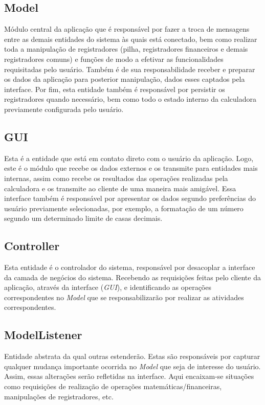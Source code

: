 \subsection{Model}
Módulo central da aplicação que é responsável por fazer a troca de mensagens entre as demais entidades do sistema às quais está conectado, bem como realizar toda a manipulação de registradores (pilha, registradores financeiros e demais registradores comuns) e funções de modo a efetivar as funcionalidades requisitadas pelo usuário. Também é de sua responsabilidade receber e preparar os dados da aplicação para posterior manipulação, dados esses captados pela interface. Por fim, esta entidade também é responsável por persistir os registradores quando necessário, bem como todo o estado interno da calculadora previamente configurada pelo usuário.

\subsection{GUI}
Esta é a entidade que está em contato direto com o usuário da aplicação. Logo, este é o módulo que recebe os dados externos e os transmite para entidades mais internas, assim como recebe os resultados das operações realizadas pela calculadora e os transmite ao cliente de uma maneira mais amigável. Essa interface também é responsável por apresentar os dados segundo preferências do usuário previamente selecionadas, por exemplo, a formatação de um número segundo um determinado limite de casas decimais.

\subsection{Controller}
Esta entidade é o controlador do sistema, responsável por desacoplar a interface da camada de negócios do sistema. Recebendo as requisições feitas pelo cliente da aplicação, através da interface (\textit{GUI}), e identificando as operações correspondentes no \textit{Model} que se responsabilizarão por realizar as atividades correspondentes.

\subsection{ModelListener}
Entidade abstrata da qual outras estenderão. Estas são responsáveis por capturar qualquer mudança importante ocorrida no \textit{Model} que seja de interesse do usuário. Assim, essas alte\-rações serão refletidas na interface. Aqui encaixam-se situações como requisições de rea\-lização de operações matemáticas/financeiras, manipulações de registradores, etc.

